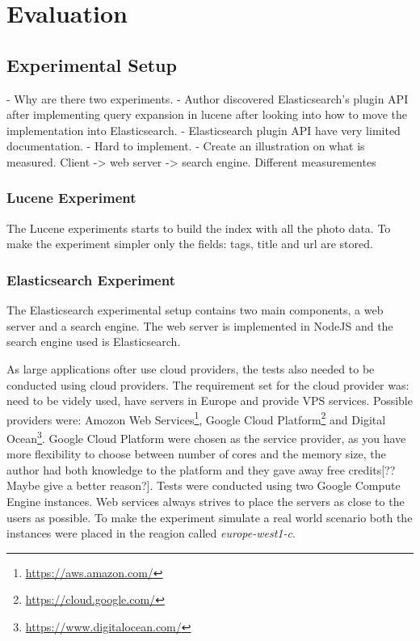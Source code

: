 \chapter{Evaluation}
\label{ch:evaluation}

\section{Experimental Setup}
- Why are there two experiments.
- Author discovered Elasticsearch's plugin API after implementing query expansion in lucene after looking into how to move the implementation into Elasticsearch.
- Elasticsearch plugin API have very limited documentation.
- Hard to implement.
- Create an illustration on what is measured. Client -> web server -> search engine. Different measurementes

\subsection{Lucene Experiment}
The Lucene experiments starts to build the index with all the photo data.
To make the experiment simpler only the fields: tags, title and url are stored.

\subsection{Elasticsearch Experiment}
The Elasticsearch experimental setup contains two main components, a web server and a search engine.
The web server is implemented in NodeJS and the search engine used is Elasticsearch.

As large applications ofter use cloud providers, the tests also needed to be conducted using cloud providers.
The requirement set for the cloud provider was: need to be videly used, have servers in Europe and provide VPS services.
Possible providers were: Amozon Web Services\footnote{\url{https://aws.amazon.com/}},
Google Cloud Platform\footnote{\url{https://cloud.google.com/}} and Digital Ocean\footnote{\url{https://www.digitalocean.com/}}.
Google Cloud Platform were chosen as the service provider, as you have more flexibility to choose between number of cores and the memory size,
the author had both knowledge to the platform and they gave away free credits[?? Maybe give a better reason?].
Tests were conducted using two Google Compute Engine instances.
Web services always strives to place the servers as close to the users as possible.
To make the experiment simulate a real world scenario both the instances were placed in the reagion called \textit{europe-west1-c}.

